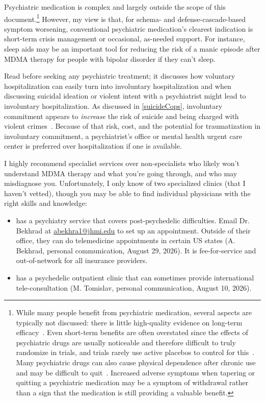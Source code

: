 \documentclass[11pt,oneside]{book}
\let\cite\parencite
\begin{document}
Psychiatric medication is complex and largely outside the scope of this document.\footnote{While many people benefit from psychiatric medication, several aspects are typically not discussed: there is little high-quality evidence on long-term efficacy~\cite{leuchtDecline}. Even short-term benefits are often overstated since the effects of psychiatric drugs are usually noticeable and therefore difficult to truly randomize in trials, and trials rarely use active placebos to control for this~\cite{hunekeExpectancy}. Many psychiatric drugs can also cause physical dependence after chronic use and may be difficult to quit~\cite{crossingZero}. Increased adverse symptoms when tapering or quitting a psychiatric medication may be a symptom of withdrawal rather than a sign that the medication is still providing a valuable benefit.} However, my view is that, for schema- and defense-cascade-based symptom worsening, conventional psychiatric medication's clearest indication is short-term crisis management or occasional, as-needed support. For instance, sleep aids may be an important tool for reducing the risk of a manic episode after MDMA therapy for people with bipolar disorder if they can't sleep.

Read \textcite{alexanderInpatient} before seeking any psychiatric treatment; it discusses how voluntary hospitalization can easily turn into involuntary hospitalization and when discussing suicidal ideation or violent intent with a psychiatrist might lead to involuntary hospitalization. As discussed in \cref{suicideCops}, involuntary commitment appears to \textit{increase} the risk of suicide and being charged with violent crimes~\cite{emanuelHospitalization}. Because of that risk, cost, and the potential for traumatization in involuntary commitment, a psychiatrist's office or mental health urgent care center is preferred over hospitalization if one is available.

I highly recommend specialist services over non-specialists who likely won't understand MDMA therapy and what you're going through, and who may misdiagnose you. Unfortunately, I only know of two specialized clinics (that I haven't vetted), though you may be able to find individual physicians with the right skills and knowledge:
\begin{itemize}
	\item \textcite{hopkinsPersonalized} has a psychiatry service that covers post-psychedelic difficulties. Email Dr. Bekhrad at \href{mailto:abekhra1@jhmi.edu}{abekhra1@jhmi.edu} to set up an appointment. Outside of their office, they can do telemedicine appointments in certain US states (A. Bekhrad, personal communication, August 29, 2026). It is fee-for-service and out-of-network for all insurance providers.
	\item \textcite{alexianerClinic} has a psychedelic outpatient clinic that can sometimes provide international tele-consultation (M. Tomislav, personal communication, August 10, 2026).
\end{itemize}
\end{document}
